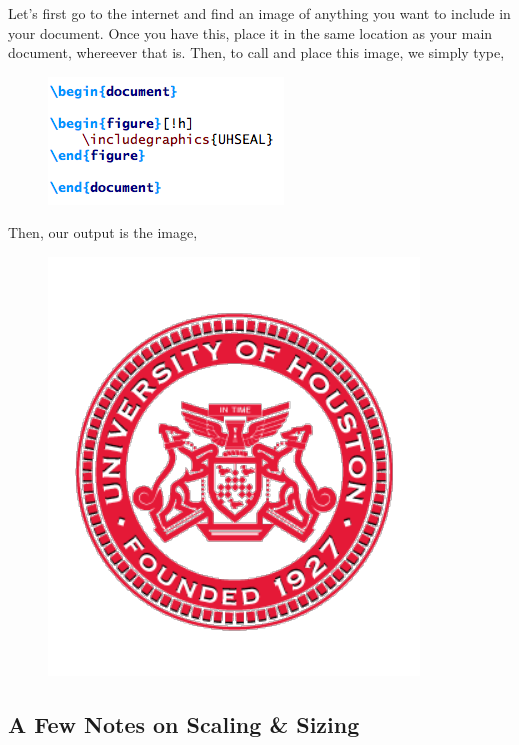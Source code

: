 \documentclass[11pt]{article}
\begin{document}
Let's first go to the internet and find an image of anything you want to include in your document. Once you have this, place it in the same location as your main document, whereever that is. Then, to call and place this image, we simply type,

\begin{figure}[!h]
	\includegraphics[scale=.5]{CODE10} \\ %
\end{figure}

\newpage

Then, our output is the image,

\begin{figure}[!h]
	\includegraphics[scale=.4]{OUT10} \\ %
	\centering
\end{figure}

\subsection{A Few Notes on Scaling \& Sizing}
\end{document}
